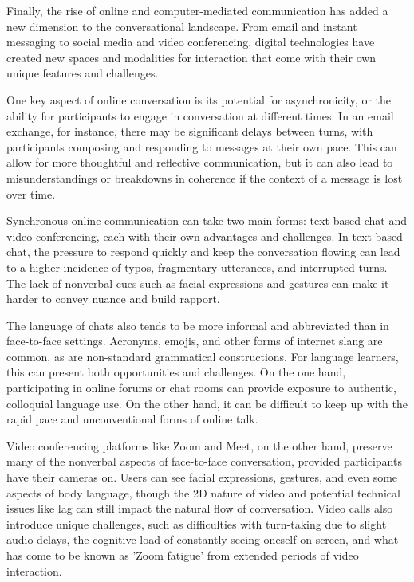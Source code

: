 Finally, the rise of online and computer-mediated communication has added a new dimension to the conversational landscape. From email and instant messaging to social media and video conferencing, digital technologies have created new spaces and modalities for interaction that come with their own unique features and challenges.

One key aspect of online conversation is its potential for asynchronicity, or the ability for participants to engage in conversation at different times. In an email exchange, for instance, there may be significant delays between turns, with participants composing and responding to messages at their own pace. This can allow for more thoughtful and reflective communication, but it can also lead to misunderstandings or breakdowns in coherence if the context of a message is lost over time.

Synchronous online communication can take two main forms: text-based chat and video conferencing, each with their own advantages and challenges. In text-based chat, the pressure to respond quickly and keep the conversation flowing can lead to a higher incidence of typos, fragmentary utterances, and interrupted turns. The lack of nonverbal cues such as facial expressions and gestures can make it harder to convey nuance and build rapport.

The language of chats also tends to be more informal and abbreviated than in face-to-face settings. Acronyms, emojis, and other forms of internet slang are common, as are non-standard grammatical constructions. For language learners, this can present both opportunities and challenges. On the one hand, participating in online forums or chat rooms can provide exposure to authentic, colloquial language use. On the other hand, it can be difficult to keep up with the rapid pace and unconventional forms of online talk.

Video conferencing platforms like Zoom and Meet, on the other hand, preserve many of the nonverbal aspects of face-to-face conversation, provided participants have their cameras on. Users can see facial expressions, gestures, and even some aspects of body language, though the 2D nature of video and potential technical issues like lag can still impact the natural flow of conversation. Video calls also introduce unique challenges, such as difficulties with turn-taking due to slight audio delays, the cognitive load of constantly seeing oneself on screen, and what has come to be known as 'Zoom fatigue' from extended periods of video interaction.

